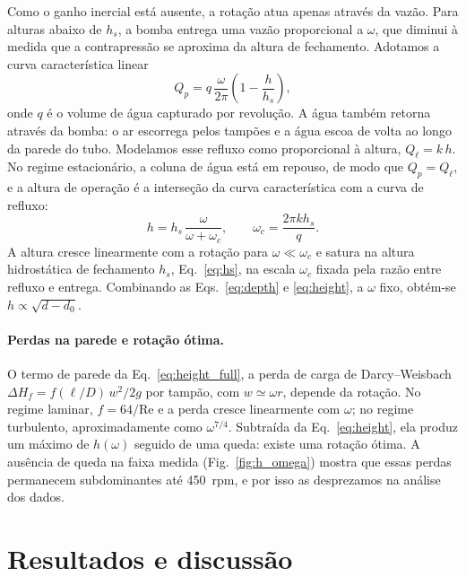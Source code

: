 \documentclass[aps,pre,twocolumn,superscriptaddress,nofootinbib,floatfix]{revtex4-2}
\begin{document}
Como o ganho inercial está ausente, a rotação atua apenas através da vazão. Para alturas abaixo de $h_s$, a bomba entrega uma vazão proporcional a $\omega$, que diminui à medida que a contrapressão se aproxima da altura de fechamento. Adotamos a curva característica linear
\begin{equation}
  Q_p = q\,\frac{\omega}{2\pi}\left(1-\frac{h}{h_s}\right),
\end{equation}
onde $q$ é o volume de água capturado por revolução. A água também retorna através da bomba: o ar escorrega pelos tampões e a água escoa de volta ao longo da parede do tubo. Modelamos esse refluxo como proporcional à altura, $Q_\ell=k\,h$. No regime estacionário, a coluna de água está em repouso, de modo que $Q_p=Q_\ell$, e a altura de operação é a interseção da curva característica com a curva de refluxo:
\begin{equation}
  h = h_s\,\frac{\omega}{\omega+\omega_c}, \qquad \omega_c = \frac{2\pi k h_s}{q}.
  \label{eq:height}
\end{equation}
A altura cresce linearmente com a rotação para $\omega\ll\omega_c$ e satura na altura hidrostática de fechamento $h_s$, Eq.~\eqref{eq:hs}, na escala $\omega_c$ fixada pela razão entre refluxo e entrega. Combinando as Eqs.~\eqref{eq:depth} e \eqref{eq:height}, a $\omega$ fixo, obtém-se $h\propto\sqrt{d-d_0}$.

\paragraph*{Perdas na parede e rotação ótima.} O termo de parede da Eq.~\eqref{eq:height_full}, a perda de carga de Darcy--Weisbach $\Delta H_f=f(\ell/D)\,w^2/2g$ por tampão, com $w\simeq\omega r$, depende da rotação. No regime laminar, $f=64/\mathrm{Re}$ e a perda cresce linearmente com $\omega$; no regime turbulento, aproximadamente como $\omega^{7/4}$. Subtraída da Eq.~\eqref{eq:height}, ela produz um máximo de $h(\omega)$ seguido de uma queda: existe uma rotação ótima. A ausência de queda na faixa medida (Fig.~\ref{fig:h_omega}) mostra que essas perdas permanecem subdominantes até \SI{450}{rpm}, e por isso as desprezamos na análise dos dados.

\section{Resultados e discussão}
\label{sec:results}
\end{document}
